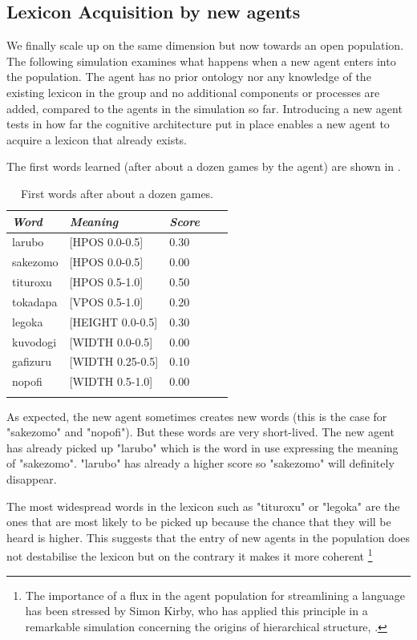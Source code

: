 \subsection{Lexicon Acquisition by new agents}

We finally scale up on the same dimension but 
now towards an open population. The following 
simulation examines what happens when a new agent 
enters into the population. The agent has no 
prior ontology nor any knowledge of the existing
lexicon in the group and no additional components
or processes are added, compared to the agents
in the simulation so far. Introducing a new 
agent tests in how far the cognitive architecture
put in place enables a new agent to acquire a 
lexicon that already exists. 

The first words learned (after about a dozen 
games by the agent) are shown in . 
\begin{table}
\begin{center}
\begin{tabular}{ l  l  l  l  l }
\lsptoprule
{\itshape Word} & {\itshape Meaning} & {\itshape Score} \\ \midrule
larubo  & [HPOS 0.0-0.5] & 0.30 \\ 
sakezomo &  [HPOS 0.0-0.5] & 0.00 \\ 
tituroxu &  [HPOS 0.5-1.0] & 0.50 \\ 
tokadapa & [VPOS 0.5-1.0] & 0.20 \\ 
legoka   & [HEIGHT 0.0-0.5] & 0.30 \\ 
kuvodogi  & [WIDTH 0.0-0.5] & 0.00 \\ 
gafizuru &  [WIDTH 0.25-0.5] & 0.10  \\ 
nopofi  & [WIDTH 0.5-1.0] & 0.00 \\ 
\lspbottomrule
\end{tabular}
\caption{\label{tab:first} First words after about a dozen games.}
\end{center}
\end{table}

As expected, the new 
agent sometimes creates new words (this is the case 
for "sakezomo" and "nopofi"). But these words are 
very short-lived. The new agent has already picked up 
"larubo" which is the word in use expressing the 
meaning of "sakezomo". "larubo" has already a higher 
score so "sakezomo" will definitely disappear. 

The most widespread words in the lexicon 
such as "tituroxu" or "legoka" are the ones that 
are most likely to be picked up because the chance
that they will be heard is higher. This suggests
that the entry of new agents in the population does
not destabilise the lexicon but on the contrary 
it makes it more coherent \footnote{The importance of a flux in the agent population for
streamlining a language has been stressed by Simon Kirby, who 
has applied this principle in a remarkable simulation 
concerning the origins of hierarchical structure, \cite{Kirby:1999}.}

